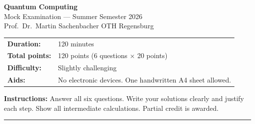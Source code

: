 \documentclass[12pt,a4paper]{exam}
\begin{document}
\begin{center}
  {\LARGE \textbf{Quantum Computing}}\\[0.4em]
  {\large Mock Examination --- Summer Semester 2026}\\[0.3em]
  {\large Prof.\ Dr.\ Martin Sachenbacher \quad OTH Regensburg}\\[1em]
  \begin{tabular}{ll}
    \textbf{Duration:}   & 120 minutes \\
    \textbf{Total points:} & 120 points (6 questions $\times$ 20 points) \\
    \textbf{Difficulty:} & Slightly challenging \\
    \textbf{Aids:}       & No electronic devices. One handwritten A4 sheet allowed. \\
  \end{tabular}
\end{center}

\bigskip
\noindent\textbf{Instructions:} Answer all six questions. Write your solutions clearly and justify each step.
Show all intermediate calculations. Partial credit is awarded.

\bigskip\hrule\bigskip
\end{document}
